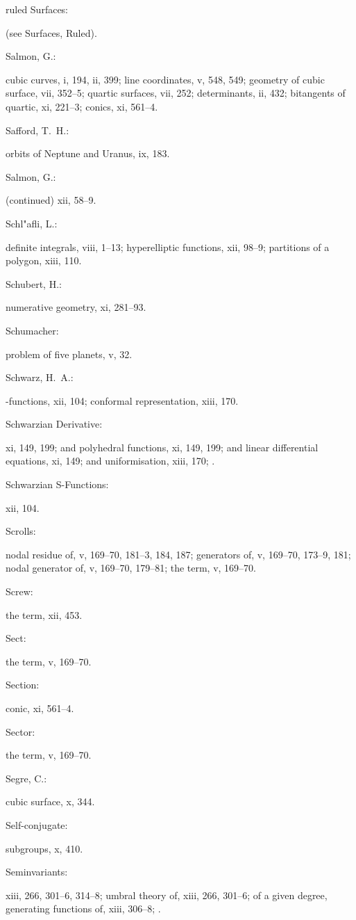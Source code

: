\documentclass[11pt,a4paper]{book}
\providecommand{\V}[1]{#1}
\providecommand{\IndexEntry}[2]{#1\dotfill #2\par}
\begin{document}
\IndexEntry{ ruled Surfaces}: (see Surfaces, Ruled).

\IndexEntry{Salmon, G.}: cubic curves, \V{i}, 194, \V{ii}, 399; line coordinates, \V{v}, 548, 549; geometry of cubic surface, \V{vii}, 352--5; quartic surfaces, \V{vii}, 252; determinants, \V{ii}, 432; bitangents of quartic, \V{xi}, 221--3; conics, \V{xi}, 561--4.

\newpage

\setcounter{page}{122}

\IndexEntry{Safford, T.\ H.}: orbits of Neptune and Uranus, \V{ix}, 183.

\IndexEntry{Salmon, G.}: (continued) \V{xii}, 58--9.

\IndexEntry{Schl"afli, L.}: definite integrals, \V{viii}, 1--13; hyperelliptic functions, \V{xii}, 98--9; partitions of a polygon, \V{xiii}, 110.

\IndexEntry{Schubert, H.}: numerative geometry, \V{xi}, 281--93.

\IndexEntry{Schumacher}: problem of five planets, \V{v}, 32.

\IndexEntry{Schwarz, H.\ A.}: \vartheta-functions, \V{xii}, 104; conformal representation, \V{xiii}, 170.

\IndexEntry{Schwarzian Derivative}: \V{xi}, 149, 199; and polyhedral functions, \V{xi}, 149, 199; and linear differential equations, \V{xi}, 149; and uniformisation, \V{xiii}, 170; .

\IndexEntry{Schwarzian S-Functions}: \V{xii}, 104.

\IndexEntry{Scrolls}: nodal residue of, \V{v}, 169--70, 181--3, 184, 187; generators of, \V{v}, 169--70, 173--9, 181; nodal generator of, \V{v}, 169--70, 179--81; the term, \V{v}, 169--70.

\IndexEntry{Screw}: the term, \V{xii}, 453.

\IndexEntry{Sect}: the term, \V{v}, 169--70.

\IndexEntry{Section}: conic, \V{xi}, 561--4.

\IndexEntry{Sector}: the term, \V{v}, 169--70.

\IndexEntry{Segre, C.}: cubic surface, \V{x}, 344.

\IndexEntry{Self-conjugate}: subgroups, \V{x}, 410.

\IndexEntry{Seminvariants}: \V{xiii}, 266, 301--6, 314--8; umbral theory of, \V{xiii}, 266, 301--6; of a given degree, generating functions of, \V{xiii}, 306--8; .
\end{document}
